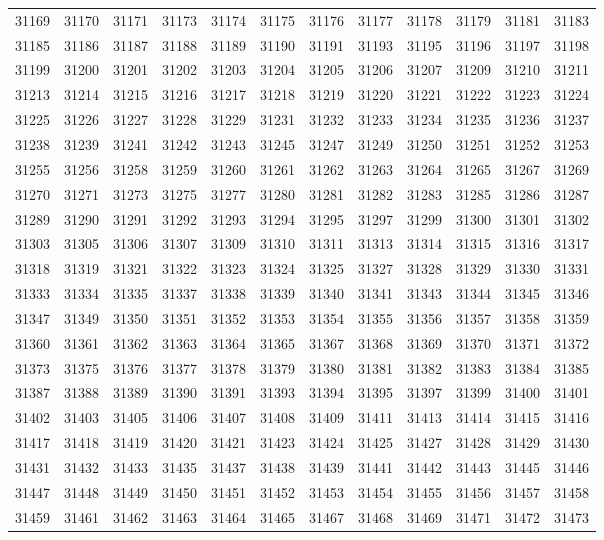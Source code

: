 \begin{center}
\begin{longtable}{llllllllllll}
31169 &31170 &31171 &31173 &31174 &31175 &31176 &31177 &31178 &31179 &31181 &31183 \\
31185 &31186 &31187 &31188 &31189 &31190 &31191 &31193 &31195 &31196 &31197 &31198 \\
31199 &31200 &31201 &31202 &31203 &31204 &31205 &31206 &31207 &31209 &31210 &31211 \\
31213 &31214 &31215 &31216 &31217 &31218 &31219 &31220 &31221 &31222 &31223 &31224 \\
31225 &31226 &31227 &31228 &31229 &31231 &31232 &31233 &31234 &31235 &31236 &31237 \\
31238 &31239 &31241 &31242 &31243 &31245 &31247 &31249 &31250 &31251 &31252 &31253 \\
31255 &31256 &31258 &31259 &31260 &31261 &31262 &31263 &31264 &31265 &31267 &31269 \\
31270 &31271 &31273 &31275 &31277 &31280 &31281 &31282 &31283 &31285 &31286 &31287 \\
31289 &31290 &31291 &31292 &31293 &31294 &31295 &31297 &31299 &31300 &31301 &31302 \\
31303 &31305 &31306 &31307 &31309 &31310 &31311 &31313 &31314 &31315 &31316 &31317 \\
31318 &31319 &31321 &31322 &31323 &31324 &31325 &31327 &31328 &31329 &31330 &31331 \\
31333 &31334 &31335 &31337 &31338 &31339 &31340 &31341 &31343 &31344 &31345 &31346 \\
31347 &31349 &31350 &31351 &31352 &31353 &31354 &31355 &31356 &31357 &31358 &31359 \\
31360 &31361 &31362 &31363 &31364 &31365 &31367 &31368 &31369 &31370 &31371 &31372 \\
31373 &31375 &31376 &31377 &31378 &31379 &31380 &31381 &31382 &31383 &31384 &31385 \\
31387 &31388 &31389 &31390 &31391 &31393 &31394 &31395 &31397 &31399 &31400 &31401 \\
31402 &31403 &31405 &31406 &31407 &31408 &31409 &31411 &31413 &31414 &31415 &31416 \\
31417 &31418 &31419 &31420 &31421 &31423 &31424 &31425 &31427 &31428 &31429 &31430 \\
31431 &31432 &31433 &31435 &31437 &31438 &31439 &31441 &31442 &31443 &31445 &31446 \\
31447 &31448 &31449 &31450 &31451 &31452 &31453 &31454 &31455 &31456 &31457 &31458 \\
31459 &31461 &31462 &31463 &31464 &31465 &31467 &31468 &31469 &31471 &31472 &31473 \\

\end{longtable}
\end{center}
